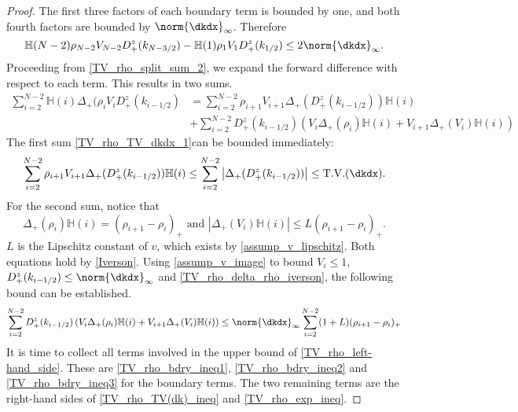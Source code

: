 \begin{proof}
 	The first three factors of each boundary term is bounded by one, and both fourth factors are bounded by $\norm{\dkdx}_\infty$. Therefore 
 	\begin{equation}
 		\mathbb{H}(N-2) \rho_{N-2} V_{N-2} D_+^z(k_{N-3/2}) - \mathbb{H}(1) \rho_{1} V_{1} D_+^z(k_{1/2}) \leq 2\norm{\dkdx}_\infty. \label{TV_rho_bdry_ineq3}
 	\end{equation}
 	Proceeding from \eqref{TV_rho_split_sum_2}, we expand the forward difference with respect to each term. This results in two sums. 
 	\begin{align}
 		\sum_{i = 2}^{N-2} \mathbb{H}(i) \Delta_+(\rho_{i} V_i D_+^z(k_{i-1/2}) &=  \sum_{i = 2}^{N-2} \rho_{i+1} V_{i+1} \Delta_+(D_+^z(k_{i-1/2})) \mathbb{H}(i) \label{TV_rho_TV_dkdx_1}\\&+ \sum_{i = 2}^{N-2} D_+^z(k_{i-1/2}) \left(V_i \Delta_+(\rho_i)\mathbb{H}(i) + V_{i+1} \Delta_+(V_i)\mathbb{H}(i)\right)  
 	\end{align}
 	The first sum \eqref{TV_rho_TV_dkdx_1}can be bounded immediately: 
 	\begin{equation}
 		\sum_{i = 2}^{N-2} \rho_{i+1} V_{i+1} \Delta_+(D_+^z(k_{i-1/2})) \mathbb{H}(i) \leq \sum_{i = 2}^{N-2} \left|\Delta_+(D_+^z(k_{i-1/2}))\right| \leq \text{T.V.}(\dkdx). \label{TV_rho_TV(dk)_ineq}
 	\end{equation}
 	For the second sum, notice that 
 	\begin{equation}
 		\Delta_+(\rho_i)\mathbb{H}(i) = (\rho_{i+1} - \rho_i)_+ \text{ and } \left|\Delta_+(V_i)\mathbb{H}(i)\right| \leq L (\rho_{i+1} - \rho_i)_+. \label{TV_rho_delta_rho_iverson}
 	\end{equation}
 	$L$ is the Lipschitz constant of $v$, which exists by \eqref{assump_v_lipschitz}. Both equations hold by \eqref{Iverson}. Using \eqref{assump_v_image} to bound $V_{i} \leq 1$, $D_+^z(k_{i-1/2}) \leq \norm{\dkdx}_\infty$ and \eqref{TV_rho_delta_rho_iverson}, the following bound can be established. 
 	\begin{align}
 		\sum_{i = 2}^{N-2} D_+^z(k_{i-1/2}) \left(V_i \Delta_+(\rho_i)\mathbb{H}(i) + V_{i+1} \Delta_+(V_i)\mathbb{H}(i)\right) \leq \norm{\dkdx}_\infty \sum_{i = 2}^{N-2} (1 + L) (\rho_{i+1} - \rho_i)_+ \label{TV_rho_exp_ineq}
 	\end{align}
 	It is time to collect all terms involved in the upper bound of \eqref{TV_rho_left-hand_side}. These are \eqref{TV_rho_bdry_ineq1}, \eqref{TV_rho_bdry_ineq2} and \eqref{TV_rho_bdry_ineq3} for the boundary terms. The two remaining terms are the right-hand sides of \eqref{TV_rho_TV(dk)_ineq} and \eqref{TV_rho_exp_ineq}.  

\end{proof}
